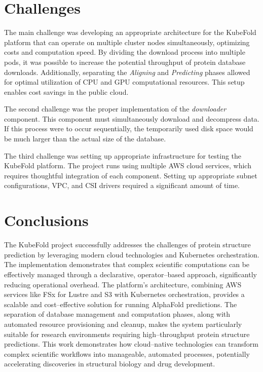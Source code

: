 \section{Challenges}

The main challenge was developing an appropriate architecture for the KubeFold platform that can operate on multiple cluster nodes simultaneously, optimizing costs and computation speed.
By dividing the download process into multiple pods, it was possible to increase the potential throughput of protein database downloads.
Additionally, separating the \textit{Aligning} and \textit{Predicting} phases allowed for optimal utilization of CPU and GPU computational resources.
This setup enables cost savings in the public cloud.

The second challenge was the proper implementation of the \textit{downloader} component.
This component must simultaneously download and decompress data.
If this process were to occur sequentially, the temporarily used disk space would be much larger than the actual size of the database.

The third challenge was setting up appropriate infrastructure for testing the KubeFold platform.
The project runs using multiple AWS cloud services, which requires thoughtful integration of each component.
Setting up appropriate subnet configurations, VPC, and CSI drivers required a significant amount of time.

\section{Conclusions}

The KubeFold project successfully addresses the challenges of protein structure prediction by leveraging modern cloud technologies and Kubernetes orchestration.
The implementation demonstrates that complex scientific computations can be effectively managed through a declarative, operator--based approach, significantly reducing operational overhead.
The platform's architecture, combining AWS services like FSx for Lustre and S3 with Kubernetes orchestration, provides a scalable and cost--effective solution for running AlphaFold predictions.
The separation of database management and computation phases, along with automated resource provisioning and cleanup, makes the system particularly suitable for research environments requiring high--throughput protein structure predictions.
This work demonstrates how cloud--native technologies can transform complex scientific workflows into manageable, automated processes, potentially accelerating discoveries in structural biology and drug development.